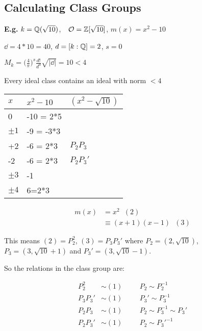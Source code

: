 \documentclass[11pt]{article}
\begin{document}
\subsection{Calculating Class Groups}

\textbf{E.g.} $k = \mathbb{Q}(\sqrt{10})$, $\hspace{7pt} \mathcal{O} = \mathbb{Z}[\sqrt{10}] $, \hspace{7pt}$m(x) = x^2 - 10$

$\dd = 4*10 = 40$, \hspace{7pt}$d =[k:\mathbb{Q}] = 2$,\hspace{7pt}  $  s = 0$
\spa

$M_k = \big(\frac4\pi\big)^s \frac{d!}{d^d} \sqrt{|\dd|} = 10 < 4$
\spa

Every ideal class contains an ideal with norm $<4$
\spac

\begin{tabular}{|l|l|l|}
	$x$     & $x^2-10$  & $(x^2 -\sqrt{10})$ \\ \hline
	0       & -10 = 2*5 &                    \\
	$\pm 1$ & -9 = -3*3 &                    \\
	+2      & -6 = 2*3  & $P_2 P_3$          \\
	-2      & -6 = 2*3  & $P_2 P_3'$         \\
	$\pm 3$ & -1        &                    \\
	$\pm 4$ & 6=2*3     &                   
\end{tabular}


\begin{align*}
	m(x) &= x^2 \hspace{7pt} (2)\\
	& \equiv (x+1)(x-1) \hspace{7pt} (3) 
\end{align*}

This means $(2) = P_2^2$, $(3) = P_3 P_3'$ where $P_2 = (2,\sqrt{10})$, $P_3 = (3, \sqrt{10}+1)$ and $P_3' = (3, \sqrt{10} -1)$.

So the relations in the class group are:

\begin{align*}
	P_2^2 & \sim (1) &&& P_2 \sim P_2^{-1}\\
	P_3P_3' & \sim (1) &&& P_3' \sim P_3^{-1}\\
	P_2P_3 &\sim (1) &&& P_2 \sim P_3^{-1} \sim P_3'\\
	P_2P_3' &\sim(1) &&& P_2 \sim P_3'^{-1}
\end{align*}
\end{document}
